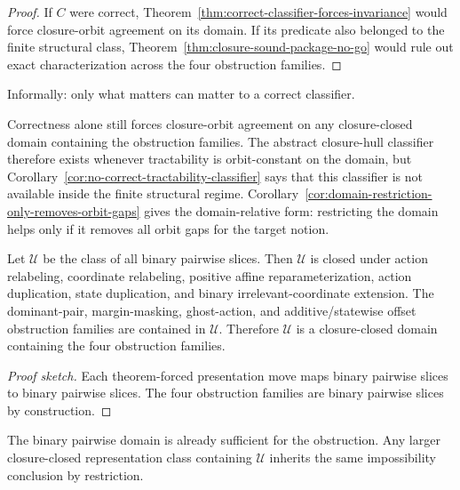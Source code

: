 \begin{proof}
If $C$ were correct, Theorem~\ref{thm:correct-classifier-forces-invariance} would force closure-orbit agreement on its domain. If its predicate also belonged to the finite structural class, Theorem~\ref{thm:closure-sound-package-no-go} would rule out exact characterization across the four obstruction families.
\end{proof}

\par\medskip
\noindent
Informally: only what matters can matter to a correct classifier.
\par\medskip

Correctness alone still forces closure-orbit agreement on any closure-closed domain containing the obstruction families. The abstract closure-hull classifier therefore exists whenever tractability is orbit-constant on the domain, but Corollary~\ref{cor:no-correct-tractability-classifier} says that this classifier is not available inside the finite structural regime. Corollary~\ref{cor:domain-restriction-only-removes-orbit-gaps} gives the domain-relative form: restricting the domain helps only if it removes all orbit gaps for the target notion.

\begin{proposition}\label{prop:full-binary-pairwise-domain-closure}
Let $\mathcal U$ be the class of all binary pairwise slices. Then $\mathcal U$ is closed under action relabeling, coordinate relabeling, positive affine reparameterization, action duplication, state duplication, and binary irrelevant-coordinate extension. The dominant-pair, margin-masking, ghost-action, and additive/statewise offset obstruction families are contained in $\mathcal U$. Therefore $\mathcal U$ is a closure-closed domain containing the four obstruction families.
\end{proposition}

\begin{proof}[Proof sketch]
Each theorem-forced presentation move maps binary pairwise slices to binary pairwise slices. The four obstruction families are binary pairwise slices by construction.
\end{proof}

The binary pairwise domain is already sufficient for the obstruction. Any larger closure-closed representation class containing $\mathcal U$ inherits the same impossibility conclusion by restriction.


